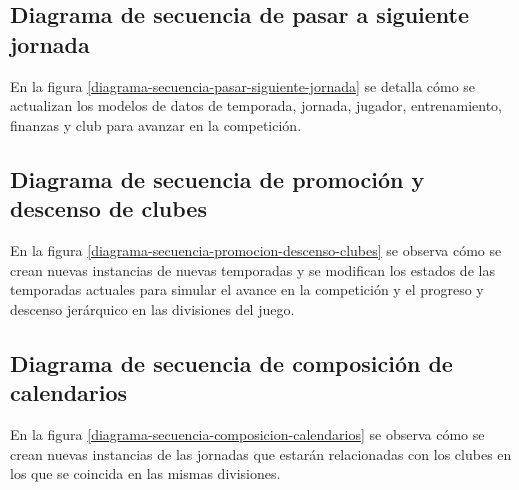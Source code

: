 

\subsection*{Diagrama de secuencia de pasar a siguiente jornada}
En la figura \ref{diagrama-secuencia-pasar-siguiente-jornada} se detalla cómo se
actualizan los modelos de datos de temporada, jornada, jugador, entrenamiento,
finanzas y club para avanzar en la competición.
\newpage
 

\subsection*{Diagrama de secuencia de promoción y descenso de clubes}
En la figura \ref{diagrama-secuencia-promocion-descenso-clubes} se observa cómo
se crean nuevas instancias de nuevas temporadas y se modifican los estados de
las temporadas actuales para simular el avance en la competición y el progreso y
descenso jerárquico en las divisiones del juego.



\subsection*{Diagrama de secuencia de composición de calendarios}
En la figura \ref{diagrama-secuencia-composicion-calendarios} se observa cómo se
crean nuevas instancias de las jornadas que estarán relacionadas con los clubes
en los que se coincida en las mismas divisiones.
\newpage

